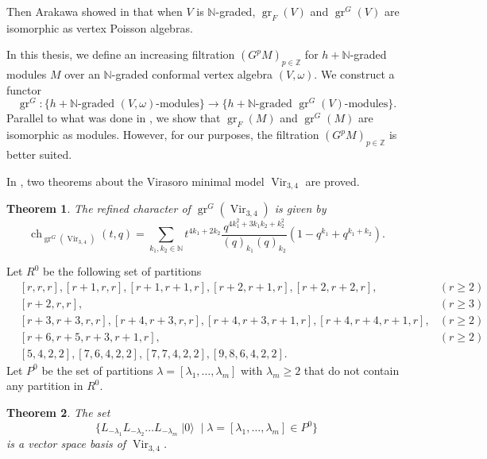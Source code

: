 \documentclass[a4paper, 12pt, reqno]{amsart}
\newtheorem{theorem}{Theorem}[section]
\theoremstyle{remark}
\DeclareMathOperator{\Vir}{Vir}
\DeclareMathOperator{\gr}{gr}
\DeclareMathOperator{\ch}{ch}
\DeclareMathOperator{\vac}{|0\rangle}
\begin{document}
Then Arakawa showed in \cite[Proposition 2.6.1]{arakawa_remark_2012} that when $V$ is $\mathbb{N}$-graded, $\gr_F(V)$ and $\gr^G(V)$ are isomorphic as vertex Poisson algebras.

In this thesis, we define an increasing filtration $(G^pM)_{p \in \mathbb{Z}}$ for $h + \mathbb{N}$-graded modules $M$ over an $\mathbb{N}$-graded conformal vertex algebra $(V, \omega)$.
We construct a functor
\begin{equation*}
  \gr^G: \{\text{$h + \mathbb{N}$-graded $(V, \omega)$-modules}\} \to \{\text{$h + \mathbb{N}$-graded $\gr^G(V)$-modules}\}.
\end{equation*}
Parallel to what was done in \cite{arakawa_remark_2012}, we show that $\gr_F(M)$ and $\gr^G(M)$ are isomorphic as modules.
However, for our purposes, the filtration $(G^pM)_{p \in \mathbb{Z}}$ is better suited.

In \cite{andrews_singular_2022}, two theorems about the Virasoro minimal model $\Vir_{3, 4}$ are proved.

\begin{theorem}
  \label{thr:1}
  The refined character of $\gr^G(\Vir_{3, 4})$ is given by
  \begin{equation*}
    \ch_{\gr^G(\Vir_{3, 4})}(t, q) = \sum_{k_1, k_2 \in \mathbb{N}}t^{4k_1 + 2k_2}\frac{q^{4k_1^2 + 3k_1k_2 + k_2^2}}{(q)_{k_1}(q)_{k_2}}(1 - q^{k_1} + q^{k_1 + k_2}).
  \end{equation*}
\end{theorem}

Let $R^0$ be the following set of partitions
\begin{align*}
  &[r, r, r], [r + 1, r, r], [r + 1, r + 1, r], [r + 2, r + 1, r], [r + 2, r + 2, r], &(r \ge 2) \\
  &[r + 2, r, r], &(r \ge 3) \\
  &[r + 3, r + 3, r, r], [r + 4, r + 3, r, r],  [r + 4, r + 3, r + 1, r], [r + 4, r + 4, r + 1, r], &(r \ge 2) \\
  &[r + 6, r + 5, r + 3, r + 1, r], &(r \ge 2) \\
  &[5, 4, 2, 2], [7, 6, 4, 2, 2], [7, 7, 4, 2, 2], [9, 8, 6, 4, 2, 2].
\end{align*}
Let $P^0$ be the set of partitions $\lambda = [\lambda_1, \dots, \lambda_m]$ with $\lambda_m \ge 2$ that do not contain any partition in $R^0$.

\begin{theorem}
  \label{thr:2}
  The set
  \begin{equation*}
    \{L_{-\lambda_1}L_{-\lambda_2}\dots L_{-\lambda_m}\vac \mid \lambda = [\lambda_1, \dots, \lambda_m] \in P^0\}
  \end{equation*}
  is a vector space basis of $\Vir_{3, 4}$.
\end{theorem}
\end{document}
